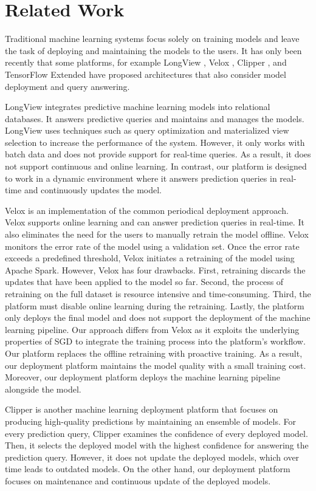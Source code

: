 \section{Related Work} \label{related-work}
Traditional machine learning systems focus solely on training models and leave the task of deploying and maintaining the models to the users.
It has only been recently that some platforms, for example LongView \cite{akdere2011case}, Velox \cite{crankshaw2014missing}, Clipper \cite{crankshaw2016clipper} , and TensorFlow Extended \cite{baylor2017tfx} have proposed architectures that also consider model deployment and query answering.

LongView integrates predictive machine learning models into relational databases. 
It answers predictive queries and maintains and manages the models.
LongView uses techniques such as query optimization and materialized view selection to increase the performance of the system.
However, it only works with batch data and does not provide support for real-time queries. 
As a result, it does not support continuous and online learning.
In contrast, our platform is designed to work in a dynamic environment where it answers prediction queries in real-time and continuously updates the model.

Velox is an implementation of the common periodical deployment approach.
Velox supports online learning and can answer prediction queries in real-time.
It also eliminates the need for the users to manually retrain the model offline.
Velox monitors the error rate of the model using a validation set.
Once the error rate exceeds a predefined threshold, Velox initiates a retraining of the model using Apache Spark. 
However, Velox has four drawbacks.
First, retraining discards the updates that have been applied to the model so far.
Second, the process of retraining on the full dataset is resource intensive and time-consuming.
Third, the platform must disable online learning during the retraining.
Lastly, the platform only deploys the final model and does not support the deployment of the machine learning pipeline.
Our approach differs from Velox as it exploits the underlying properties of SGD to integrate the training process into the platform's workflow.
Our platform replaces the offline retraining with proactive training.
As a result, our deployment platform maintains the model quality with a small training cost.
Moreover, our deployment platform deploys the machine learning pipeline alongside the model.

Clipper is another machine learning deployment platform that focuses on producing high-quality predictions by maintaining an ensemble of models.
For every prediction query, Clipper examines the confidence of every deployed model.
Then, it selects the deployed model with the highest confidence for answering the prediction query.
However, it does not update the deployed models, which over time leads to outdated models.
On the other hand, our deployment platform focuses on maintenance and continuous update of the deployed models.

